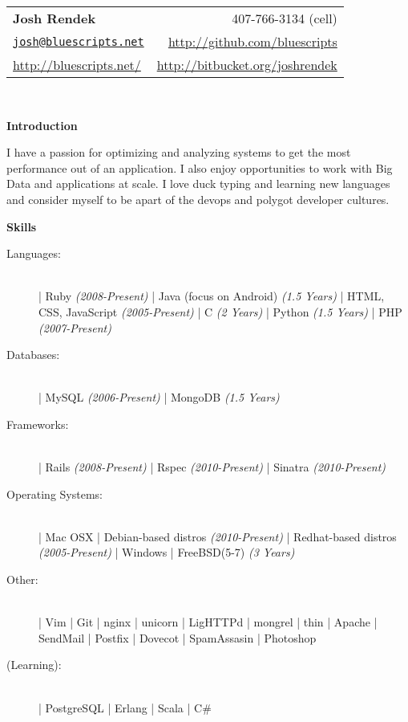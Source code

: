 \documentclass[letterpaper,11pt]{article}
\newcommand{\resheading}[1]{{\large \colorbox{myblue}{\begin{minipage}{\textwidth}{\textbf{#1 \vphantom{p\^{E}}}}\end{minipage}}}}
\begin{document}
\newcommand{\infoheader}{
\begin{tabular*}{7.5in}{l@{\extracolsep{\fill}}r}
\textbf{\LARGE Josh Rendek }  & 407-766-3134 (cell) \\ 
\href{mailto:josh@bluescripts.net}{\nolinkurl{josh@bluescripts.net}} & \url{http://github.com/bluescripts} \\
\url{http://bluescripts.net/} & \url{http://bitbucket.org/joshrendek} \\
\end{tabular*}
\\

\vspace{0.1in}
}

\newcommand{\pagebreakwithheader}{\pagebreak\infoheader}

\infoheader

\resheading{Introduction}
I have a passion for optimizing and analyzing systems to get the most performance out of an application. I also enjoy opportunities to work with Big Data and applications at scale. I love duck typing and learning new languages and consider myself to be apart of the devops and polygot developer cultures.
\linebreak

\resheading{Skills}

\begin{description}
    \item[Languages:] \hfill \\
        | Ruby \textit{(2008-Present)} 
        | Java (focus on Android) \textit{(1.5 Years)} 
        | HTML, CSS, JavaScript \textit{(2005-Present)} 
        | C \textit{(2 Years)} 
        | Python \textit{(1.5 Years)} 
        | PHP \textit{(2007-Present)}
    \item[Databases:] \hfill  \\
        | MySQL \textit{(2006-Present)} 
        | MongoDB \textit{(1.5 Years)}
    \item[Frameworks:] \hfill \\
        | Rails \textit{(2008-Present)} 
        | Rspec \textit{(2010-Present)}    
        | Sinatra \textit{(2010-Present)} 
    \item[Operating Systems:] \hfill \\
        | Mac OSX   
        | Debian-based distros \textit{(2010-Present)}
        | Redhat-based distros \textit{(2005-Present)}
        | Windows   
        | FreeBSD(5-7) \textit{(3 Years)}
    \item[Other:] \hfill \\
        | Vim       
        | Git       
        | nginx     
        | unicorn   
        | LigHTTPd  
        | mongrel   
        | thin      
        | Apache   
        | SendMail
        | Postfix  
        | Dovecot 
        | SpamAssasin 
        | Photoshop 
    \item[(Learning):] \hfill \\
        | PostgreSQL
        | Erlang 
        | Scala 
        | C\#
\end{description}
\end{document}

